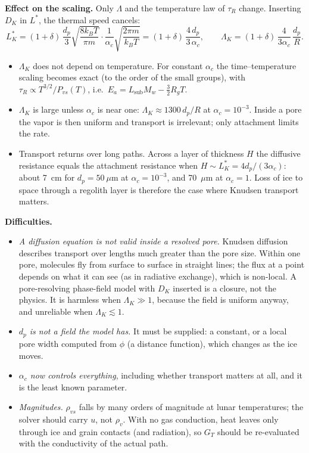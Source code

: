 \documentclass[11pt]{article}
\newcommand{\rvs}{\rho_{vs}}
\begin{document}
\textbf{Effect on the scaling.} Only $\Lambda$ and the temperature law of
$\tau_{R}$ change. Inserting $D_K$ in $L^{*}$, the thermal speed cancels:
\begin{equation}
L^{*}_K = (1+\delta)\,\frac{d_p}{3}\sqrt{\frac{8k_BT}{\pi m}}\cdot\frac{1}{\alpha_c}\sqrt{\frac{2\pi m}{k_BT}}
 = (1+\delta)\,\frac{4\,d_p}{3\,\alpha_c} ,
\qquad
\Lambda_K = (1+\delta)\,\frac{4}{3\alpha_c}\,\frac{d_p}{R} .
\label{eq:LK}
\end{equation}
\begin{itemize}
\item $\Lambda_K$ does not depend on temperature. For constant $\alpha_c$
  the time--temperature scaling becomes exact (to the order of the small
  groups), with $\tau_{R} \propto T^{3/2}/P_{vs}(T)$, i.e.\ $E_a =
  L_{\mathrm{sub}}M_w - \tfrac32R_gT$.
\item $\Lambda_K$ is large unless $\alpha_c$ is near one: $\Lambda_K \approx
  1300\,d_p/R$ at $\alpha_c = 10^{-3}$. Inside a pore the vapor is then
  uniform and transport is irrelevant; only attachment limits the rate.
\item Transport returns over long paths. Across a layer of thickness $H$ the
  diffusive resistance equals the attachment resistance when $H \sim L^{*}_K
  = 4d_p/(3\alpha_c)$: about 7~cm for $d_p = 50~\mu$m at $\alpha_c =
  10^{-3}$, and 70~$\mu$m at $\alpha_c = 1$. Loss of ice to space through a
  regolith layer is therefore the case where Knudsen transport matters.
\end{itemize}

\textbf{Difficulties.}
\begin{itemize}
\item \emph{A diffusion equation is not valid inside a resolved pore.}
  Knudsen diffusion describes transport over lengths much greater than the
  pore size. Within one pore, molecules fly from surface to surface in
  straight lines; the flux at a point depends on what it can see (as in
  radiative exchange), which is non-local. A pore-resolving phase-field
  model with $D_K$ inserted is a closure, not the physics. It is harmless
  when $\Lambda_K \gg 1$, because the field is uniform anyway, and
  unreliable when $\Lambda_K \lesssim 1$.
\item \emph{$d_p$ is not a field the model has.} It must be supplied: a
  constant, or a local pore width computed from $\phi$ (a distance
  function), which changes as the ice moves.
\item \emph{$\alpha_c$ now controls everything}, including whether transport
  matters at all, and it is the least known parameter.
\item \emph{Magnitudes.} $\rvs$ falls by many orders of magnitude at lunar
  temperatures; the solver should carry $u$, not $\rho_v$. With no gas
  conduction, heat leaves only through ice and grain contacts (and
  radiation), so $G_T$ should be re-evaluated with the conductivity of the
  actual path.
\end{itemize}
\end{document}
